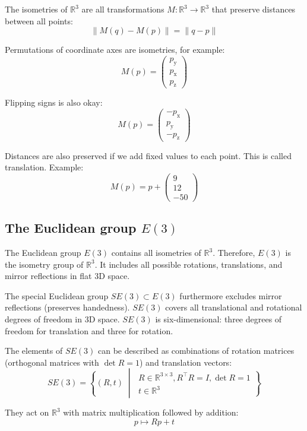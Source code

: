 \documentclass[twocolumn,10pt]{article}
\begin{document}
The isometries of $\mathbb{R}^3$ are all transformations $M: \mathbb{R}^3 \to \mathbb{R}^3$ that preserve distances between all points:
\[
    \| M(q) - M(p) \| = \| q - p \|
\]

Permutations of coordinate axes are isometries, for example:
\[
    M(p) = \begin{pmatrix}p_\mathrm{y}\\p_\mathrm{x}\\p_\mathrm{z}\end{pmatrix}
\]

Flipping signs is also okay:
\[
    M(p) = \begin{pmatrix}-p_\mathrm{x}\\p_\mathrm{y}\\-p_\mathrm{z}\end{pmatrix}
\]

Distances are also preserved if we add fixed values to each point. This is called translation. Example:
\[
    M(p) = p + \begin{pmatrix}9\\12\\-50\end{pmatrix}
\]

\subsection{The Euclidean group $E(3)$}

The Euclidean group $E(3)$ contains all isometries of $\mathbb{R}^3$. Therefore, $E(3)$ is the isometry group of $\mathbb{R}^3$. It includes all possible rotations, translations, and mirror reflections in flat 3D space.

The special Euclidean group $SE(3) \subset E(3)$ furthermore excludes mirror reflections (preserves handedness). $SE(3)$ covers all translational and rotational degrees of freedom in 3D space. $SE(3)$ is six-dimensional: three degrees of freedom for translation and three for rotation.

The elements of $SE(3)$ can be described as combinations of rotation matrices (orthogonal matrices with $\det R = 1$) and translation vectors:
\[
    SE(3) = \left\{ (R, t) \;\middle|\; \begin{gathered} R \in \mathbb{R}^{3 \times 3}, R^\top R = I, \det R = 1 \\ t \in \mathbb{R}^3 \end{gathered} \right\}
\]

They act on $\mathbb{R}^3$ with matrix multiplication followed by addition:
\[
    p \mapsto Rp + t
\]
\end{document}
